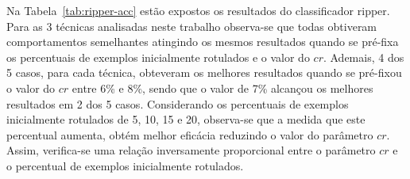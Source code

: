     Na Tabela~\ref{tab:ripper-acc} estão expostos os resultados do classificador \ac{ripper}. Para as 3 técnicas analisadas neste trabalho observa\hyp{se} que todas obtiveram comportamentos semelhantes atingindo os mesmos resultados quando se pré\hyp{fixa} os percentuais de exemplos inicialmente rotulados e o valor do $cr$. Ademais, 4 dos 5 casos, para cada técnica, obteveram os melhores resultados quando se pré\hyp{fixou} o valor do $cr$ entre 6\% e 8\%, sendo que o valor de 7\% alcançou os melhores resultados em 2 dos 5 casos. Considerando os percentuais de exemplos inicialmente rotulados de 5, 10, 15 e 20, observa\hyp{se} que a medida que este percentual aumenta, obtém melhor eficácia reduzindo o valor do parâmetro $cr$. Assim, verifica\hyp{se} uma relação inversamente proporcional entre o parâmetro $cr$ e o percentual de exemplos inicialmente rotulados. 
    
    
